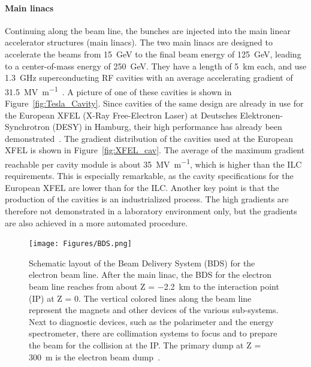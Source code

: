\paragraph{Main linacs}
Continuing along the beam line, the bunches are injected into the main linear accelerator structures (main linacs).
The two main linacs are designed to accelerate the beams from \SI{15}{\GeV} to the final beam energy of \SI{125}{\GeV}, leading to a center-of-mass energy of \SI{250}{\GeV}.
They have a length of \SI{5}{\kilo\meter} each, and use \SI{1.3}{\giga\hertz} superconducting RF cavities with an average accelerating gradient of \SI{31.5}{\mega\volt\per\meter}~\cite{Walker}.
A picture of one of these cavities is shown in Figure~\ref{fig:Tesla_Cavity}. 
Since cavities of the same design are already in use for the European XFEL (X-Ray Free-Electron Laser) at Deutsches Elektronen-Synchrotron (DESY) in Hamburg, their high performance has already been demonstrated~\cite{XFEL}.
The gradient distribution of the cavities used at the European XFEL is shown in Figure~\ref{fig:XFEL_cav}.
The average of the maximum gradient reachable per cavity module is about \SI{35}{\mega\volt\per\meter}, which is higher than the ILC requirements.
This is especially remarkable, as the cavity specifications for the European XFEL are lower than for the ILC.
Another key point is that the production of the cavities is an industrialized process.
The high gradients are therefore not demonstrated in a laboratory environment only, but the gradients are also achieved in a more automated procedure.

\begin{figure}[h!]
\centering
\texttt{[image: Figures/BDS.png]}
\caption[Layout of the ILC Beam Delivery System]{Schematic layout of the Beam Delivery System (BDS) for the electron beam line.
After the main linac, the BDS for the electron beam line reaches from about Z = \SI[detect-all]{-2.2}{\kilo\meter} to the interaction point (IP) at Z = 0.
The vertical colored lines along the beam line represent the magnets and other devices of the various sub-systems.
Next to diagnostic devices, such as the polarimeter and the energy spectrometer, there are collimation systems to focus and to prepare the beam for the collision at the IP.
The primary dump at Z = \SI[detect-all]{300}{\meter} is the electron beam dump~\cite[p. 135]{TDR32}.}
\label{fig:BDS}
\end{figure}

